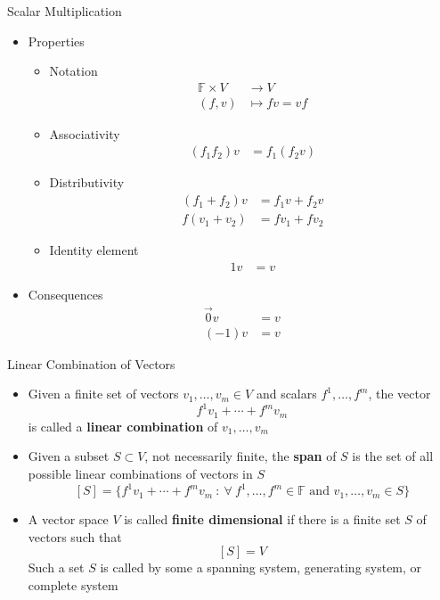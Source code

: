 \documentclass[usenames,dvipsnames,10pt]{beamer}
\newcommand\F{\mathbb{F}}
\newcommand\zero{\vec{0}}
\begin{document}
\begin{frame}
  {Scalar Multiplication}

  \begin{itemize}
  \item Properties
    \begin{itemize}
    \item Notation
      \begin{align*}
        \F \times V &\rightarrow V\\
        (f, v) &\mapsto f v = v f
      \end{align*}
    \item Associativity
      \begin{align*}
        (f_1f_2)v &= f_1(f_2v)
      \end{align*}
    \item Distributivity
      \begin{align*}
        (f_1+f_2)v &= f_1v + f_2v\\
        f (v_1+ v_2) &= f v_1 + f v_2
      \end{align*}
    \item Identity element
      \begin{align*}
        1 v &= v
      \end{align*}
    \end{itemize}
  \item Consequences
    \begin{align*}
      \zero v &= v\\
      (-1) v &= v
    \end{align*}
  \end{itemize}
\end{frame}

\begin{frame}
  {Linear Combination of Vectors}

  \begin{itemize}
  \item Given a finite set of vectors $v_1, \dots, v_m \in V$ and scalars $f^1, \dots, f^m$, the vector
    \[
      f^1v_1 + \cdots + f^mv_m
    \]
    is called a {\bf linear combination} of $v_1, \dots, v_m$
  \item Given a subset $S \subset V$, not necessarily finite, the {\bf span} of $S$ is the set of all possible linear combinations of vectors in $S$
    \[
      [S] = \{ f^1v_1 + \cdots + f^mv_m\ :\ \forall\ f^1, \dots, f^m \in \F\text{ and }v_1, \dots, v_m \in S \}
    \]
  \item A vector space $V$ is called {\bf finite dimensional} if there is a finite set $S$ of vectors such that
    \[
      [S] = V
    \]
    Such a set $S$ is called by some a spanning system, generating system, or complete system
  \end{itemize}
\end{frame}
\end{document}
